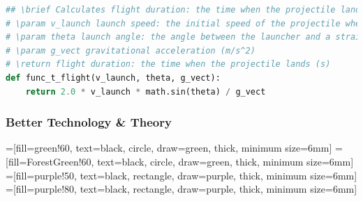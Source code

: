 \documentclass[usenames,dvipsnames,10pt]{beamer}
\begin{document}
\begin{frame}[fragile]
\begin{lstlisting}[language=Python,basicstyle=\ttfamily\tiny,
  keywordstyle=\bfseries,breaklines=false]
## \brief Calculates flight duration: the time when the projectile lands (s)
# \param v_launch launch speed: the initial speed of the projectile when launched (m/s)
# \param theta launch angle: the angle between the launcher and a straight line from the launcher to the target (rad)
# \param g_vect gravitational acceleration (m/s^2)
# \return flight duration: the time when the projectile lands (s)
def func_t_flight(v_launch, theta, g_vect):
    return 2.0 * v_launch * math.sin(theta) / g_vect

\end{lstlisting}
\end{frame}
  
\begin{frame}
  
  \frametitle{Better Technology \& Theory}
  =[fill=green!60, text=black, circle, draw=green, thick, minimum size=6mm]
  =[fill=ForestGreen!60, text=black, circle, draw=green, thick, minimum size=6mm]
  =[fill=purple!50, text=black, rectangle, draw=purple, thick, minimum size=6mm]
  =[fill=purple!80, text=black, rectangle, draw=purple, thick, minimum size=6mm]


\end{frame}
  
\end{document}
